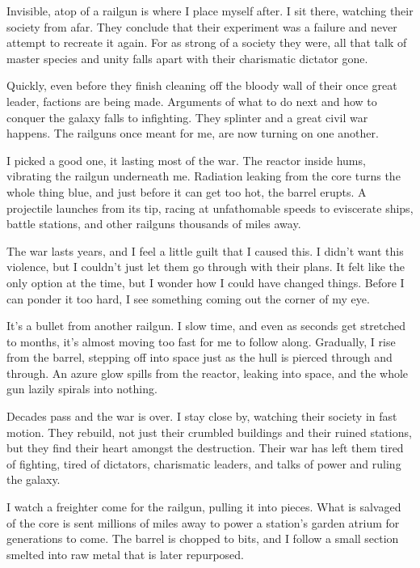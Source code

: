 Invisible, atop of a railgun is where I place myself after. I sit there,
watching their society from afar. They conclude that their experiment
was a failure and never attempt to recreate it again. For as strong of a
society they were, all that talk of master species and unity falls apart
with their charismatic dictator gone.

Quickly, even before they finish cleaning off the bloody wall of their
once great leader, factions are being made. Arguments of what to do next
and how to conquer the galaxy falls to infighting. They splinter and a
great civil war happens. The railguns once meant for me, are now turning
on one another.

I picked a good one, it lasting most of the war. The reactor inside
hums, vibrating the railgun underneath me. Radiation leaking from the
core turns the whole thing blue, and just before it can get too hot, the
barrel erupts. A projectile launches from its tip, racing at
unfathomable speeds to eviscerate ships, battle stations, and other
railguns thousands of miles away.

The war lasts years, and I feel a little guilt that I caused this. I
didn't want this violence, but I couldn't just let them go through with
their plans. It felt like the only option at the time, but I wonder how
I could have changed things. Before I can ponder it too hard, I see
something coming out the corner of my eye.

It's a bullet from another railgun. I slow time, and even as seconds get
stretched to months, it's almost moving too fast for me to follow along.
Gradually, I rise from the barrel, stepping off into space just as the
hull is pierced through and through. An azure glow spills from the
reactor, leaking into space, and the whole gun lazily spirals into
nothing.

Decades pass and the war is over. I stay close by, watching their
society in fast motion. They rebuild, not just their crumbled buildings
and their ruined stations, but they find their heart amongst the
destruction. Their war has left them tired of fighting, tired of
dictators, charismatic leaders, and talks of power and ruling the
galaxy.

I watch a freighter come for the railgun, pulling it into pieces. What
is salvaged of the core is sent millions of miles away to power a
station's garden atrium for generations to come. The barrel is chopped
to bits, and I follow a small section smelted into raw metal that is
later repurposed.

